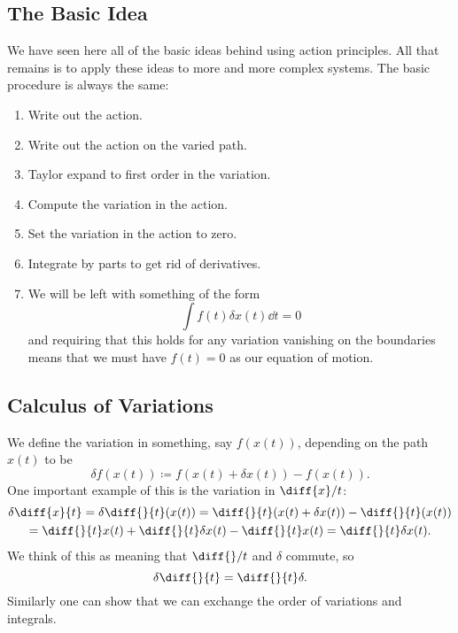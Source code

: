 \subsection{The Basic Idea}
We have seen here all of the basic ideas behind using action principles.
All that remains is to apply these ideas to more and more complex systems.
The basic procedure is always the same:
\begin{enumerate}
    \item Write out the action.
    \item Write out the action on the varied path.
    \item Taylor expand to first order in the variation.
    \item Compute the variation in the action.
    \item Set the variation in the action to zero.
    \item Integrate by parts to get rid of derivatives.
    \item We will be left with something of the form
    \begin{equation}
        \int f(t) \delta x(t) \dd{t} = 0
    \end{equation}
    and requiring that this holds for any variation vanishing on the boundaries means that we must have \(f(t) = 0\) as our equation of motion.
\end{enumerate}

\subsection{Calculus of Variations}
We define the variation in something, say \(f(x(t))\), depending on the path \(x(t)\) to be
\begin{equation}
    \delta f(x(t)) \coloneqq f(x(t) + \delta x(t)) - f(x(t)).
\end{equation}
One important example of this is the variation in \(\diff{x}/{t}\):
\begin{multline}
    \delta \diff{x}{t} = \delta \diff{}{t}(x(t)) = \diff{}{t}(x(t) + \delta x(t)) - \diff{}{t}(x(t))\\
    = \diff{}{t}x(t) + \diff{}{t}\delta x(t) - \diff{}{t} x(t) = \diff{}{t} \delta x(t).
\end{multline}
We think of this as meaning that \(\diff{}/{t}\) and \(\delta\) commute, so
\begin{equation}
    \delta \diff{}{t} = \diff{}{t}\delta.
\end{equation}
Similarly one can show that we can exchange the order of variations and integrals.

